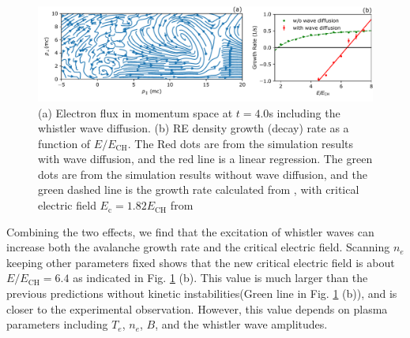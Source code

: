 \documentclass[aps, prl, preprint,english,superscriptaddress]{revtex4-1}
\begin{document}
\begin{figure}[h]
	\begin{center}
		\includegraphics[width=0.9\linewidth]{vortex}
	\end{center}
    \caption{\label{fig:vortex} (a) Electron flux in momentum space at $t=4.0$s including the whistler wave diffusion. (b) RE density growth (decay) rate as a function of $E/E_{\mathrm{CH}}$. The Red dots are from the simulation results with wave diffusion, and the red line is a linear regression. The green dots are from the simulation results without wave diffusion, and the green dashed line is the growth rate calculated from \cite{rosenbluth_theory_1997}, with critical electric field $E_\mathrm{c}=1.82 E_{\mathrm{CH}}$ from \cite{liu_adjoint_2017}}
\end{figure}

Combining the two effects, we find that the excitation of whistler waves can increase both the avalanche growth rate and the critical electric field. Scanning $n_e$ keeping other parameters fixed shows that the new critical electric field
is about $E/E_{\mathrm{CH}}=6.4$ as indicated in Fig. \ref{fig:vortex} (b). This value is much larger than the previous predictions without kinetic instabilities(Green line in Fig. \ref{fig:vortex} (b)), and is closer to the experimental observation. However, this value depends on plasma parameters including $T_{e}$, $n_{e}$, $B$, and the whistler wave amplitudes.
\end{document}
